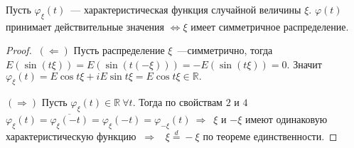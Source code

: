 	\begin{property}
		Пусть $\varphi_\xi(t)$~--- характеристическая функция случайной величины $\xi$. $\varphi(t)$ принимает действительные значения $\Leftrightarrow \xi$ имеет симметричное распределение.
		\begin{proof}
			$~(\Leftarrow)$ Пусть распределение $\xi$~---симметрично, тогда $E(\sin(t\xi)) = E(\sin(t(-\xi))) = -E(\sin(t\xi)) = 0.$ Значит $\varphi_\xi(t) = E\cos t\xi + iE\sin t\xi = E\cos t\xi \in \mathbb{R}.$

			$(\Rightarrow)$ Пусть $\varphi_\xi(t) \in \mathbb{R} ~\forall t.$ Тогда по свойствам $2$ и $4$ $\varphi_\xi(t) = \overline{\varphi_\xi(-t)} = \varphi_\xi(-t) = \varphi_{-\xi}(t) ~\Rightarrow $~$\xi$ и $-\xi$ имеют одинаковую характеристическую функцию $~\Rightarrow$~ $\xi \overset{d}{=} -\xi$ по теореме единственности.
		\end{proof}
	\end{property}

